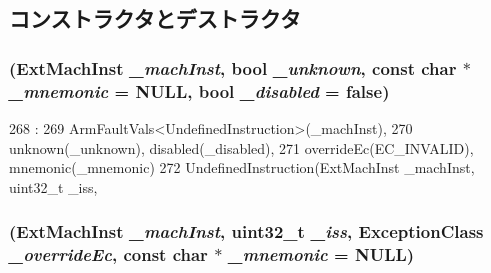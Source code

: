 \subsection{コンストラクタとデストラクタ}
\hypertarget{classArmISA_1_1UndefinedInstruction_a4896cdc6731c9fc601e3d5ce8ca26c6e}{
\subsubsection[{UndefinedInstruction}]{ (ExtMachInst {\em \_\-machInst}, \/  bool {\em \_\-unknown}, \/  const char $\ast$ {\em \_\-mnemonic} = {\ttfamily NULL}, \/  bool {\em \_\-disabled} = {\ttfamily false})}}
\label{classArmISA_1_1UndefinedInstruction_a4896cdc6731c9fc601e3d5ce8ca26c6e}



\begin{DoxyCode}
268                                                  :
269         ArmFaultVals<UndefinedInstruction>(_machInst),
270         unknown(_unknown), disabled(_disabled),
271         overrideEc(EC_INVALID), mnemonic(_mnemonic)
272     {}
    UndefinedInstruction(ExtMachInst _machInst, uint32_t _iss,
\end{DoxyCode}
\hypertarget{classArmISA_1_1UndefinedInstruction_a5eb139880bd865099005b05ea572a0a8}{
\subsubsection[{UndefinedInstruction}]{ (ExtMachInst {\em \_\-machInst}, \/  {\bf uint32\_\-t} {\em \_\-iss}, \/  {\bf ExceptionClass} {\em \_\-overrideEc}, \/  const char $\ast$ {\em \_\-mnemonic} = {\ttfamily NULL})}}
\label{classArmISA_1_1UndefinedInstruction_a5eb139880bd865099005b05ea572a0a8}



